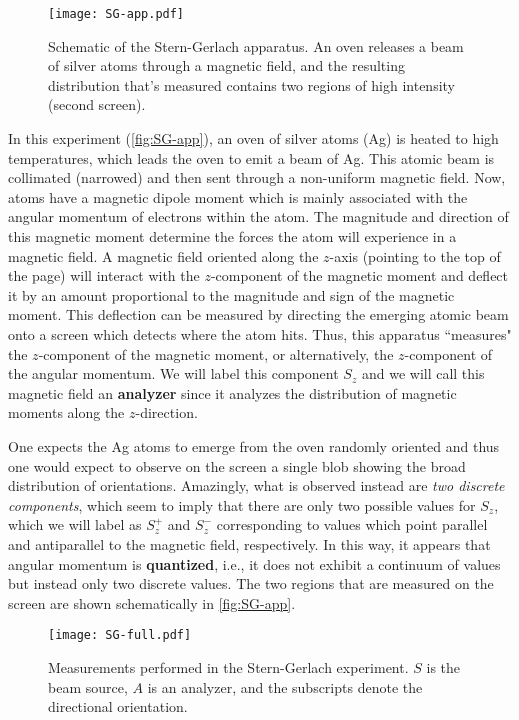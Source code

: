 \begin{figure}[!h]
	\centering
	\texttt{[image: SG-app.pdf]}
	\caption{Schematic of the Stern-Gerlach apparatus. 
	An oven releases a beam of silver atoms through a magnetic field, and the resulting distribution that's measured contains two regions of high intensity (second screen).}
	\label{fig:SG-app}
\end{figure}

In this experiment (\autoref{fig:SG-app}), an oven of silver atoms (Ag) is heated to high temperatures, which leads the oven to emit a beam of Ag. 
This atomic beam is collimated (narrowed) and then sent through a non-uniform magnetic field. 
Now, atoms have a magnetic dipole moment which is mainly associated with the angular momentum of electrons within the atom. 
The magnitude and direction of this magnetic moment determine the forces the atom will experience in a magnetic field. 
A magnetic field oriented along the $z$-axis (pointing to the top of the page) will interact with the $z$-component of the magnetic moment and deflect it by an amount proportional to the magnitude and sign of the magnetic moment. 
This deflection can be measured by directing the emerging atomic beam onto a screen which detects where the atom hits. 
Thus, this apparatus ``measures" the $z$-component of the magnetic moment, or alternatively, the $z$-component of the angular momentum. 
We will label this component $S_z$ and we will call this magnetic field an \textbf{analyzer} since it analyzes the distribution of magnetic moments along the $z$-direction. \par

One expects the Ag atoms to emerge from the oven randomly oriented and thus one would expect to observe on the screen a single blob showing the broad distribution of orientations. 
Amazingly, what is observed instead are \emph{two discrete components}, which seem to imply that there are only two possible values for $S_z$, which we will label as $S_z^+$ and $S_z^-$ corresponding to values which point parallel and antiparallel to the magnetic field, respectively. 
In this way, it appears that angular momentum is \textbf{quantized}, i.e., it does not exhibit a continuum of values but instead only two discrete values. 
The two regions that are measured on the screen are shown schematically in \autoref{fig:SG-app}.

\begin{figure}[!h]
	\centering
	\texttt{[image: SG-full.pdf]}
	\caption{Measurements performed in the Stern-Gerlach experiment. $S$ is the beam source, $A$ is an analyzer, and the subscripts denote the directional orientation.}
	\label{fig:SG-full}
\end{figure}

